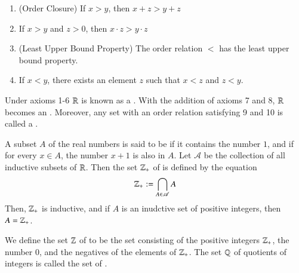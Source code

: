 \begin{construction}
\begin{enumerate}
            \item (Order Closure) If $x > y$, then $x+z > y+z$
            \item If $x > y$ and $z > 0$, then $x\cdot z > y\cdot z$
            \item (Least Upper Bound Property) The order relation $<$ has the least upper bound property.
            \item If $x < y$, there exists an element $z$ such that $x < z$ and $z < y$.
        \end{enumerate}
        Under axioms 1-6 $\mathbb R$ is known as a . With the addition of axioms 7 and 8, $\mathbb R$ becomes an . Moreover, any set with an order relation satisfying 9 and 10 is called a .
    \end{construction}

    \begin{definition}
        A subset $A$ of the real numbers is said to be  if it contains the number $1$, and if for every $x \in A$, the number $x+1$ is also in $A$. Let $\mathscr{A}$ be the collection of all inductive subsets of $\mathbb R$. Then the set $\mathbb Z_{+}$ of  is defined by the equation \begin{equation}
            \mathbb Z_+ := \bigcap\limits_{A\in\mathscr{A}}A
        \end{equation}
        Then, $\mathbb Z_+$ is inductive, and if $A$ is an inudctive set of positive integers, then $A = \mathbb Z_+$.
    \end{definition}

    \begin{definition}[Integers]
        We define the set $\mathbb Z$ of  to be the set consisting of the positive integers $\mathbb Z_+$, the number $0$, and the negatives of the elements of $\mathbb Z_+$. The set $\mathbb Q$ of quotients of integers is called the set of .
    \end{definition}

